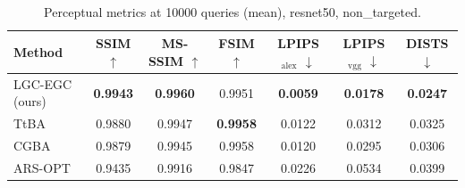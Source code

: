 \begin{table}[t]
\centering\footnotesize
\caption{Perceptual metrics at 10000 queries (mean), resnet50, non\_targeted.}
\begin{tabular}{lcccccc}
\toprule
Method & SSIM $\uparrow$ & MS-SSIM $\uparrow$ & FSIM $\uparrow$ & LPIPS$_{\mathrm{alex}}$ $\downarrow$ & LPIPS$_{\mathrm{vgg}}$ $\downarrow$ & DISTS $\downarrow$ \\
\midrule
LGC-EGC (ours) & \textbf{0.9943} & \textbf{0.9960} & 0.9951 & \textbf{0.0059} & \textbf{0.0178} & \textbf{0.0247} \\
TtBA & 0.9880 & 0.9947 & \textbf{0.9958} & 0.0122 & 0.0312 & 0.0325 \\
CGBA & 0.9879 & 0.9945 & 0.9958 & 0.0120 & 0.0295 & 0.0306 \\
ARS-OPT & 0.9435 & 0.9916 & 0.9847 & 0.0226 & 0.0534 & 0.0399 \\
\bottomrule
\end{tabular}
\end{table}
